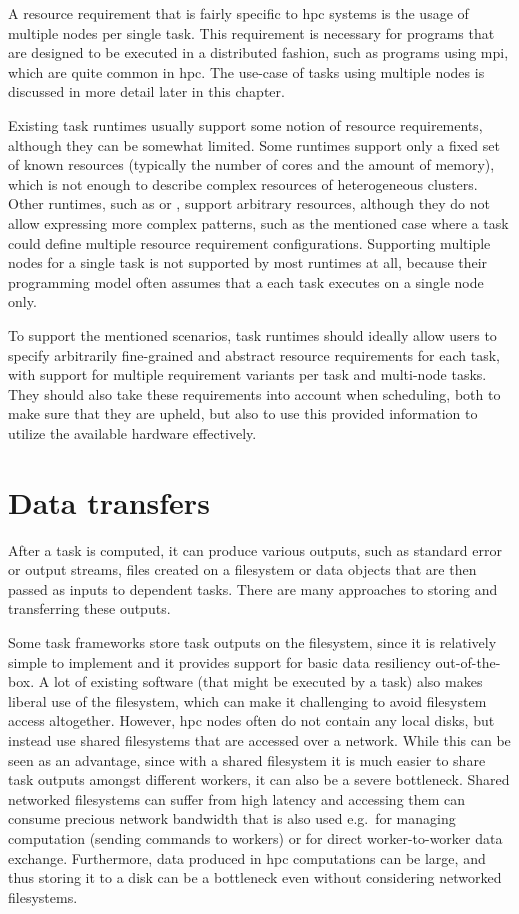 A resource requirement that is fairly specific to \gls{hpc} systems is the usage
of multiple nodes per single task. This requirement is necessary for programs that are designed to
be executed in a distributed fashion, such as programs using \gls{mpi}, which are
quite common in \gls{hpc}. The use-case of tasks using multiple nodes is
discussed in more detail later in this chapter.

Existing task runtimes usually support some notion of resource requirements, although they can be
somewhat limited. Some runtimes support only a fixed set of known resources (typically the number
of cores and the amount of memory), which is not enough to describe complex resources of
heterogeneous clusters. Other runtimes, such as \dask{} or
\snakemake{}, support arbitrary resources, although they do not allow expressing
more complex patterns, such as the mentioned case where a task could define multiple resource
requirement configurations. Supporting multiple nodes for a single task is not supported by most
runtimes at all, because their programming model often assumes that a each task executes on a
single node only.

To support the mentioned scenarios, task runtimes should ideally allow users to specify arbitrarily
fine-grained and abstract resource requirements for each task, with support for multiple
requirement variants per task and multi-node tasks. They should also take these requirements into
account when scheduling, both to make sure that they are upheld, but also to use this provided
information to utilize the available hardware effectively.

\section{Data transfers}
After a task is computed, it can produce various outputs, such as standard error or output streams,
files created on a filesystem or data objects that are then passed as inputs to dependent tasks.
There are many approaches to storing and transferring these outputs.

Some task frameworks store task outputs on the filesystem, since it is relatively simple to
implement and it provides support for basic data resiliency out-of-the-box. A lot of existing
software (that might be executed by a task) also makes liberal use of the filesystem, which can
make it challenging to avoid filesystem access altogether. However, \gls{hpc}
nodes often do not contain any local disks, but instead use shared filesystems that are accessed
over a network. While this can be seen as an advantage, since with a shared filesystem it is much
easier to share task outputs amongst different workers, it can also be a severe bottleneck. Shared
networked filesystems can suffer from high latency and accessing them can consume precious network
bandwidth that is also used e.g.\ for managing computation (sending commands to workers) or for
direct worker-to-worker data exchange. Furthermore, data produced in \gls{hpc}
computations can be large, and thus storing it to a disk can be a bottleneck even without
considering networked filesystems.

